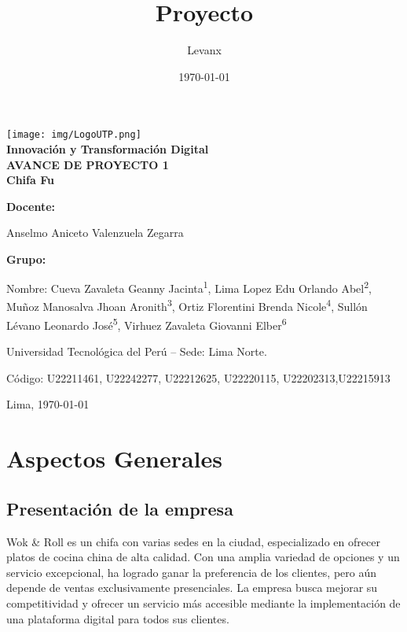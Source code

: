 \documentclass{article}
\title{Proyecto}
\author{Levanx}
\date{\today}
\begin{document}
\begin{doublespace}
\begin{center}
    \vspace*{1cm}

    \centering
    \texttt{[image: img/LogoUTP.png]}\\[1cm]
    
    \large{\textbf{Innovación y Transformación Digital}} 
    \\[0.5cm] 
    
    \large{\bf AVANCE DE PROYECTO 1}
    \\[0.5cm] 
    \LARGE \textbf{{Chifa Fu}}
\end{center}
\vspace{2cm}
\large{\bf Docente: }
\begin{center}
    \large{Anselmo Aniceto Valenzuela Zegarra}
\end{center}
\large{\bf Grupo: }
\begin{center}
    \large{Nombre: Cueva Zavaleta Geanny Jacinta\textsuperscript{1}, Lima Lopez Edu Orlando Abel\textsuperscript{2}, Muñoz Manosalva Jhoan Aronith\textsuperscript{3}, Ortiz Florentini Brenda Nicole\textsuperscript{4}, Sullón Lévano Leonardo José\textsuperscript{5}, Virhuez Zavaleta Giovanni Elber\textsuperscript{6}}
\end{center}
\begin{center}
    \large{ Universidad Tecnológica del Perú – Sede: Lima Norte.}
\end{center}
    
\begin{center}
    \large{Código: U22211461, U22242277, U22212625, U22220115, U22202313,U22215913}
\end{center}
\begin{center}
Lima, \today
\end{center}
\newpage
\vspace*{0.1cm}
\tableofcontents
\newpage
\vspace*{0.2cm}
\section{Aspectos Generales}
    \subsection{Presentación de la empresa}
    \noindent Wok \& Roll es un chifa con varias sedes en la ciudad, especializado en ofrecer
platos de cocina china de alta calidad. Con una amplia variedad de opciones y un servicio excepcional, ha logrado ganar la preferencia de los clientes, pero aún depende de ventas exclusivamente presenciales. La empresa busca mejorar su competitividad y ofrecer un servicio más accesible mediante la implementación de una plataforma digital para todos sus clientes.


\end{doublespace}
\end{document}
